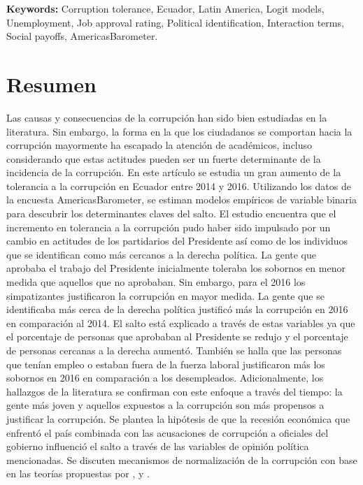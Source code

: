 \documentclass[12pt,a4]{article}\usepackage[]{graphicx}\usepackage[]{xcolor}
\begin{document}
\noindent \textbf{Keywords:} Corruption tolerance, Ecuador, Latin America, Logit models, Unemployment, Job approval rating, Political identification, Interaction terms, Social payoffs, AmericasBarometer. 

\clearpage

\clearpage

\section*{Resumen}

\noindent Las causas y consecuencias de la corrupción han sido bien estudiadas en la literatura. Sin embargo, la forma en la que los ciudadanos se comportan hacia la corrupción mayormente ha escapado la atención de académicos, incluso considerando que estas actitudes pueden ser un fuerte determinante de la incidencia de la corrupción. En este artículo se estudia un gran aumento de la tolerancia a la corrupción en Ecuador entre 2014 y 2016. Utilizando los datos de la encuesta AmericasBarometer, se estiman modelos empíricos de variable binaria para descubrir los determinantes claves del salto. El estudio encuentra que el incremento en tolerancia a la corrupción pudo haber sido impulsado por un cambio en actitudes de los partidarios del Presidente así como de los individuos que se identifican como más cercanos a la derecha política. La gente que aprobaba el trabajo del Presidente inicialmente toleraba los sobornos en menor medida que aquellos que no aprobaban. Sin embargo, para el 2016 los simpatizantes justificaron la corrupción en mayor medida. La gente que se identificaba más cerca de la derecha política justificó más la corrupción en 2016 en comparación al 2014. El salto está explicado a través de estas variables ya que el porcentaje de personas que aprobaban al Presidente se redujo y el porcentaje de personas cercanas a la derecha aumentó. También se halla que las personas que tenían empleo o estaban fuera de la fuerza laboral justificaron más los sobornos en 2016 en comparación a los desempleados. Adicionalmente, los hallazgos de la literatura se confirman con este enfoque a través del tiempo: la gente más joven y aquellos expuestos a la corrupción son más propensos a justificar la corrupción. Se plantea la hipótesis de que la recesión económica que enfrentó el país combinada con las acusaciones de corrupción a oficiales del gobierno influenció el salto a través de las variables de opinión política mencionadas. Se discuten mecanismos de normalización de la corrupción con base en las teorías propuestas por \textcite{Ashforth.2003}, \textcite{Hurtado.2007} y \textcite{Adoum.2000}. 
\end{document}
